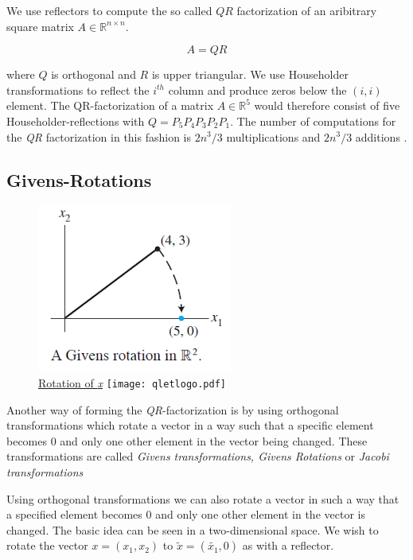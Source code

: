 \documentclass[12pt]{article}
\begin{document}
We use reflectors to compute the so called $QR$ factorization of an aribitrary square matrix $A \in \mathbb{R}^{n \times n}$.

\begin{equation}
\label{QR-prop}
A = QR
\end{equation}

where $Q$ is orthogonal and $R$ is upper triangular. We use Householder transformations to reflect the $i^{th}$ column and produce zeros below the $(i, i)$ element. The QR-factorization of a matrix $A \in \mathbb{R}^5$ would therefore consist of five Householder-reflections with $Q=P_5 P_4 P_3 P_2 P_1$. The number of computations for the \textit{QR} factorization in this fashion is $2n^3 / 3$ multiplications and $2n^3 / 3$ additions \citep[p. 110]{NLA}.
\newpage
\subsection{Givens-Rotations}

\begin{figure}
\centering
\caption{\href {https://github.com/thsis/NIS18/blob/master/media/plots}{Rotation of \textit{x}}  \protect\texttt{[image: qletlogo.pdf]}}
\includegraphics[scale=0.5]{../media/plots/givens.png}
\end{figure}

Another way of forming the \textit{QR}-factorization is by using orthogonal transformations which rotate a vector in a way such that a specific element becomes 0 and only one other element in the vector being changed. These transformations are called \textit{Givens transformations, Givens Rotations} or \textit{Jacobi transformations}

Using orthogonal transformations we can also rotate a vector in such a way that a specified element becomes 0 and only one other element in the vector is changed. The basic idea can be seen in a two-dimensional space. We wish to rotate the vector $x = (x_1, x_2)$ to $\tilde{x} = (\tilde{x_1}, 0)$ as with a reflector.
\end{document}
